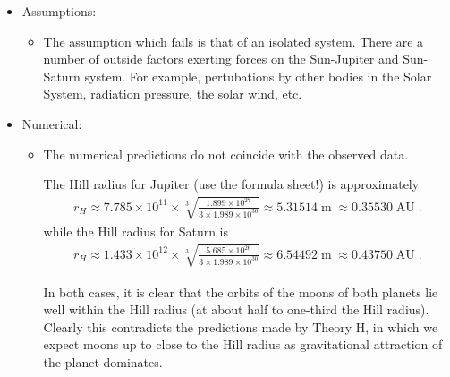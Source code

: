 \documentclass[a4paper,11pt]{exam}
\begin{document}
\begin{questions}
\begin{solution}
		\begin{itemize}
			\item Assumptions:
			\begin{itemize}
				\item The assumption which fails is that of an isolated system. There are a number of outside factors exerting forces on the Sun-Jupiter and Sun-Saturn system. For example, pertubations by other bodies in the Solar System, radiation pressure, the solar wind, etc.
			\end{itemize}
			
			\item Numerical:
			\begin{itemize}
				\item The numerical predictions do not coincide with the observed data.
				
				The Hill radius for Jupiter (use the formula sheet!) is approximately
				\begin{align*}
				r_H \approx 7.785\times 10^{11} \times \sqrt[3]{\frac{1.899\times 10^{27}}{3\times 1.989\times 10^{30}}} \approx 5.31514 \operatorname{m} \approx 0.35530 \operatorname{AU}.
				\end{align*}
				while the Hill radius for Saturn is
				\begin{align*}
				r_H \approx 1.433\times 10^{12} \times \sqrt[3]{\frac{5.685\times 10^{26}}{3\times 1.989\times 10^{30}}} \approx 6.54492 \operatorname{m} \approx 0.43750 \operatorname{AU}.
				\end{align*}
				
				In both cases, it is clear that the orbits of the moons of both planets lie well within the Hill radius (at about half to one-third the Hill radius). Clearly this contradicts the predictions made by Theory H, in which we expect moons up to close to the Hill radius as gravitational attraction of the planet dominates.
			\end{itemize}
		\end{itemize}
	\end{solution}
		
\end{questions}
\end{document}
